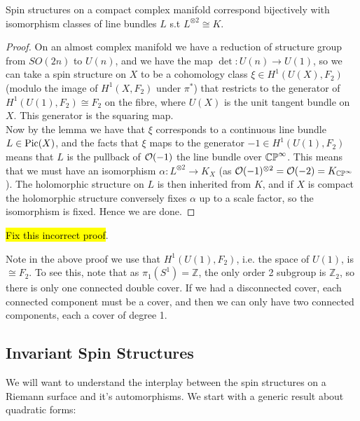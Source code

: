 \documentclass{article}
\begin{document}
\begin{prop}
	Spin structures on a compact complex manifold correspond bijectively with isomorphism classes of line bundles $L$ s.t $L^{\otimes 2}\cong K$. 
\end{prop}
\begin{proof}
	On an almost complex manifold we have a reduction of structure group from $SO(2n)$ to $U(n)$, and we have the map $\det:U(n) \to U(1)$, so we can take a spin structure on $X$ to be a cohomology class $\xi \in H^1(U(X),F_2)$ (modulo the image of $H^1(X,F_2)$ under $\pi^\ast$) that restricts to the generator of $H^1(U(1),F_2)\cong F_2$ on the fibre, where $U(X)$ is the unit tangent bundle on $X$. This generator is the squaring map. \\
	Now by the lemma we have that $\xi$ corresponds to a continuous line bundle $L \in \operatorname{Pic}(X)$, and the facts that $\xi$ maps to the generator $-1 \in H^1(U(1),F_2)$ means that $L$ is the pullback of $\mathcal{O}(-1)$ the line bundle over $\mathbb{CP}^\infty$. This means that we must have an isomorphism $\alpha:L^{\otimes 2} \to K_X$ (as $\mathcal{O}(-1)^{\otimes 2} = \mathcal{O}(-2) = K_{\mathbb{CP}^\infty}$). The holomorphic structure on $L$ is then inherited from $K$, and if $X$ is compact the holomorphic structure conversely fixes $\alpha$ up to a scale factor, so the isomorphism is fixed. Hence we are done.
\end{proof}
\hl{Fix this incorrect proof}. 
\begin{remark}
	Note in the above proof we use that $H^1(U(1), F_2)$, i.e. the space of $U(1)$, is $\cong F_2$. To see this, note that as $\pi_1(S^1)= \mathbb{Z}$, the only order 2 subgroup is $\mathbb{Z}_2$, so there is only one connected double cover. If we had a disconnected cover, each connected component must be a cover, and then we can only have two connected components, each a cover of degree 1. 
\end{remark}

\subsection{Invariant Spin Structures}

We will want to understand the interplay between the spin structures on a Riemann surface and it's automorphisms. We start with a generic result about quadratic forms:
\end{document}
